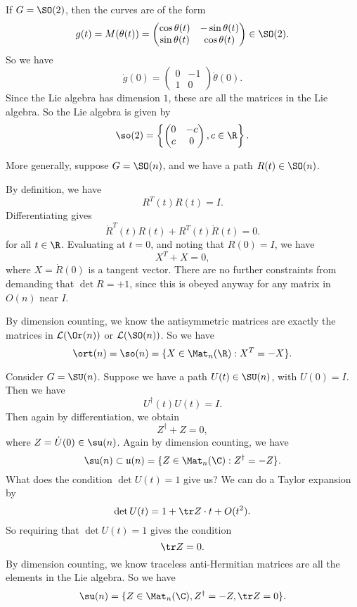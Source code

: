 \documentclass[a4paper]{article}
\begin{document}
\begin{eg}
  If $G = \SO(2)$, then the curves are of the form
  \[
    g(t) = M(\theta(t)) =
    \begin{pmatrix}
      \cos \theta(t) & -\sin \theta (t)\\
      \sin \theta(t) & \cos \theta(t)
    \end{pmatrix} \in \SO(2).
  \]
  So we have
  \[
    \dot{g}(0) =
    \begin{pmatrix}
      0 & -1\\
      1 & 0
    \end{pmatrix} \dot{\theta}(0).
  \]
  Since the Lie algebra has dimension $1$, these are all the matrices in the Lie algebra. So the Lie algebra is given by
  \[
    \so(2) = \left\{
      \begin{pmatrix}
        0 & -c\\
        c & 0
      \end{pmatrix}, c \in \R
    \right\}.
  \]
\end{eg}

\begin{eg}
  More generally, suppose $G = \SO(n)$, and we have a path $R(t) \in \SO(n)$.

  By definition, we have
  \[
    R^T(t) R(t) = I.
  \]
  Differentiating gives
  \[
    \dot{R}^T(t) R(t) + R^T(t) \dot{R}(t) = 0.
  \]
  for all $t \in \R$. Evaluating at $t = 0$, and noting that $R(0) = I$, we have
  \[
    X^T + X = 0,
  \]
  where $X = \dot{R}(0)$ is a tangent vector. There are no further constraints from demanding that $\det R = +1$, since this is obeyed anyway for any matrix in $O(n)$ near $I$.

  By dimension counting, we know the antisymmetric matrices are exactly the matrices in $\mathcal{L}(\Or(n))$ or $\mathcal{L}(\SO(n))$. So we have
  \[
    \ort(n) = \so(n) = \{X \in \Mat_n(\R): X^T = -X\}.
  \]
\end{eg}

\begin{eg}
  Consider $G = \SU(n)$. Suppose we have a path $U(t) \in \SU(n)$, with $U(0) = I$. Then we have
  \[
    U^\dagger (t) U(t) = I.
  \]
  Then again by differentiation, we obtain
  \[
    Z^\dagger + Z = 0,
  \]
  where $Z = \dot{U}(0) \in \su(n)$. Again by dimension counting, we have
  \[
    \su(n) \subset \mathfrak{u}(n) = \{Z \in \Mat_n(\C): Z^\dagger = -Z\}.
  \]
  What does the condition $\det U(t) = 1$ give us? We can do a Taylor expansion by
  \[
    \det U(t) = 1 + \tr Z \cdot t + O(t^2).
  \]
  So requiring that $\det U(t) = 1$ gives the condition
  \[
    \tr Z = 0.
  \]
  By dimension counting, we know traceless anti-Hermitian matrices are all the elements in the Lie algebra. So we have
  \[
    \su(n) = \{Z \in \Mat_n(\C), Z^\dagger = -Z, \tr Z = 0\}.
  \]
\end{eg}
\end{document}
